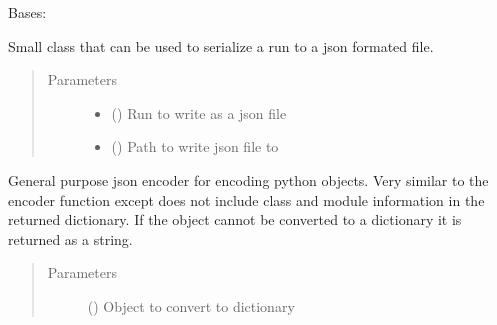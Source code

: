 \documentclass[letterpaper,10pt,english]{sphinxmanual}
\begin{document}
\begin{fulllineitems}
\label{\detokenize{polo.utils:polo.utils.io_utils.JsonWriter}}
Bases: {\hyperref[\detokenize{polo.utils:polo.utils.io_utils.RunSerializer}]{}}

Small class that can be used to serialize a run to a
json formated file.
\begin{quote}\begin{description}
\item[{Parameters}] \leavevmode\begin{itemize}
\item {} 
 ({\hyperref[\detokenize{polo.crystallography:polo.crystallography.run.Run}]{}}) \textendash{} Run to write as a json file

\item {} 
 () \textendash{} Path to write json file to

\end{itemize}

\end{description}\end{quote}

\begin{fulllineitems}
\label{\detokenize{polo.utils:polo.utils.io_utils.JsonWriter.json_encoder}}
General purpose json encoder for encoding python objects. Very
similar to the encoder function 
{\hyperref[\detokenize{polo.utils:polo.utils.io_utils.XtalWriter.json_encoder}]{}} except does not
include class and module information in the returned dictionary. If
the object cannot be converted to a dictionary it is returned as a
string.
\begin{quote}\begin{description}
\item[{Parameters}] \leavevmode
{} () \textendash{} Object to convert to dictionary


\end{description}
\end{quote}
\end{fulllineitems}
\end{fulllineitems}
\end{document}
